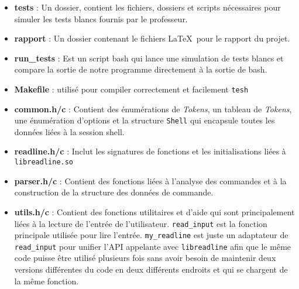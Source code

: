 \documentclass[12pt]{article}
\begin{document}
\begin{itemize}
    \item \textbf{tests} : Un dossier, contient les fichiers, dossiers et scripts nécessaires pour simuler les tests blancs fournis par le professeur.
    \item \textbf{rapport} : Un dossier contenant le fichiers \LaTeX~pour le rapport du projet.
    \item \textbf{run\_tests} : Est un script bash qui lance une simulation de tests blancs et compare la sortie de notre programme directement à la sortie de bash.
    \item \textbf{Makefile} : utilisé pour compiler correctement et facilement \texttt{tesh}
    \item \textbf{common.h/c} : Contient des énumérations de \textit{Tokens}, un tableau de \textit{Tokens}, une énumération d'options et la structure \texttt{Shell} qui encapsule toutes les données liées à la session shell.
    \item \textbf{readline.h/c} : Inclut les signatures de fonctions et les initialisations liées à \texttt{libreadline.so}
    \item \textbf{parser.h/c} : Contient des fonctions liées à l'analyse des commandes et à la construction de la structure des données de commande.
    \item \textbf{utils.h/c} : Contient des fonctions utilitaires et d'aide qui sont principalement liées à la lecture de l'entrée de l'utilisateur. \texttt{read\_input} est la fonction principale utilisée pour lire l'entrée. \texttt{my\_readline} est juste un adaptateur de \texttt{read\_input} pour unifier l'API appelante avec \texttt{libreadline} afin que le même code puisse être utilisé plusieurs fois sans avoir besoin de maintenir deux versions différentes du code en deux différents endroits et qui se chargent de la même fonction.
    

\end{itemize}
\end{document}
